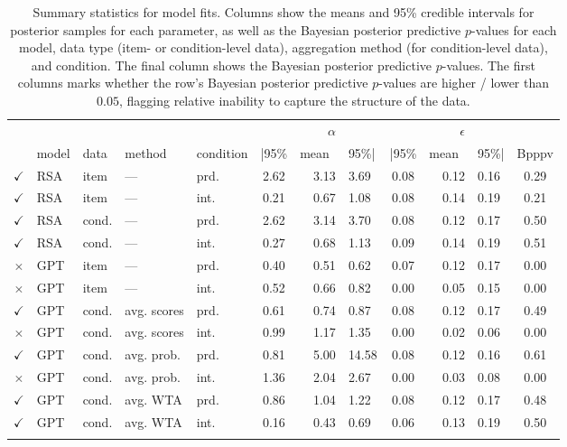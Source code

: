 \documentclass[fleqn]{article}
\begin{document}
\begin{table}[t]
\centering
\begin{tabular}{cllllcrlcrlc}
  \toprule
  &&&&&& $\alpha$ &&& $\epsilon$ & \\ \cmidrule(r){6-8} \cmidrule(l){9-11}
  & model & data & method & condition & |95\% & mean\ & 95\%| & |95\% & mean\ & 95\%| & Bpppv \\
  \midrule
  \textcolor{fern-main}{$\checkmark$} & RSA & item  & ---         & prd. & 2.62 & 3.13 & 3.69  & 0.08 & 0.12 & 0.16 & 0.29 \\
  \textcolor{fern-main}{$\checkmark$} & RSA & item  & ---         & int. & 0.21 & 0.67 & 1.08  & 0.08 & 0.14 & 0.19 & 0.21 \\
  \textcolor{fern-main}{$\checkmark$} & RSA & cond. & ---         & prd. & 2.62 & 3.14 & 3.70  & 0.08 & 0.12 & 0.17 & 0.50 \\
  \textcolor{fern-main}{$\checkmark$} & RSA & cond. & ---         & int. & 0.27 & 0.68 & 1.13  & 0.09 & 0.14 & 0.19 & 0.51 \\ \addlinespace[0.5em]
  \textcolor{shimmer-main}{$\times$} & GPT & item  & ---         & prd. & 0.40 & 0.51 & 0.62  & 0.07 & 0.12 & 0.17 & 0.00 \\
  \textcolor{shimmer-main}{$\times$} & GPT & item  & ---         & int. & 0.52 & 0.66 & 0.82  & 0.00 & 0.05 & 0.15 & 0.00 \\
  \textcolor{fern-main}{$\checkmark$} & GPT & cond. & avg. scores & prd. & 0.61 & 0.74 & 0.87  & 0.08 & 0.12 & 0.17 & 0.49 \\
  \textcolor{shimmer-main}{$\times$} & GPT & cond. & avg. scores & int. & 0.99 & 1.17 & 1.35  & 0.00 & 0.02 & 0.06 & 0.00 \\
  \textcolor{fern-main}{$\checkmark$} & GPT & cond. & avg. prob.  & prd. & 0.81 & 5.00 & 14.58 & 0.08 & 0.12 & 0.16 & 0.61 \\
  \textcolor{shimmer-main}{$\times$} & GPT & cond. & avg. prob.  & int. & 1.36 & 2.04 & 2.67  & 0.00 & 0.03 & 0.08 & 0.00 \\
  \textcolor{fern-main}{$\checkmark$} & GPT & cond. & avg. WTA    & prd. & 0.86 & 1.04 & 1.22  & 0.08 & 0.12 & 0.17 & 0.48 \\
  \textcolor{fern-main}{$\checkmark$} & GPT & cond. & avg. WTA    & int. & 0.16 & 0.43 & 0.69  & 0.06 & 0.13 & 0.19 & 0.50 \\
   \bottomrule \\
\end{tabular}
\caption{
  Summary statistics for model fits.
  Columns show the means and 95\% credible intervals for posterior samples for each parameter, as well as the Bayesian posterior predictive $p$-values for each model, data type (item- or condition-level data), aggregation method (for condition-level data), and condition.
  The final column shows the Bayesian posterior predictive $p$-values.
  The first columns marks whether the row's Bayesian posterior predictive $p$-values are higher / lower than $0.05$, flagging relative inability to capture the structure of the data.
}
\label{tab:sumStats}
\end{table}
\end{document}
